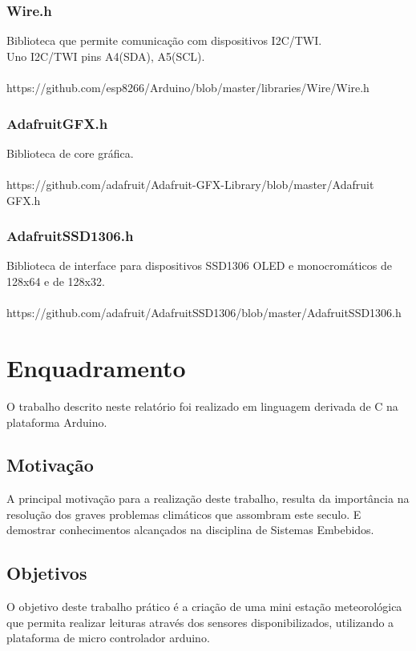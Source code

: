 \documentclass[12pt,a4paper,portrait]{article}
\begin{document}
			\subsubsection{Wire.h}
			Biblioteca que permite comunicação com dispositivos I2C/TWI.\\
			Uno I2C/TWI pins A4(SDA), A5(SCL).\\\\
			https://github.com/esp8266/Arduino/blob/master/libraries/Wire/Wire.h\\
			\cite{wire}
			\subsubsection{Adafruit\textunderscore GFX.h}
			Biblioteca de core gráfica.\\\\
			https://github.com/adafruit/Adafruit-GFX-Library/blob/master/Adafruit \textunderscore GFX.h\\
			\cite{adafruitGFX}
			\subsubsection{Adafruit\textunderscore SSD1306.h}
			Biblioteca de interface para dispositivos SSD1306 OLED e monocromáticos de 128x64 e de 128x32.\\\\
			https://github.com/adafruit/Adafruit\textunderscore SSD1306/blob/master/Adafruit\textunderscore SSD1306.h\\
			\cite{adafruitSSD1306}
			\newpage
	\section{Enquadramento}
	O trabalho descrito neste relatório foi realizado em linguagem derivada de C na plataforma Arduino.
		\subsection{Motivação}
		A principal motivação para a realização deste trabalho, resulta da importância na resolução dos graves problemas climáticos que assombram este seculo. E demostrar conhecimentos alcançados na disciplina de Sistemas Embebidos.
		\subsection{Objetivos}
		O objetivo deste trabalho prático é a criação de uma mini estação meteorológica que permita realizar leituras através dos sensores disponibilizados, utilizando a plataforma de micro controlador arduino.
\end{document}
